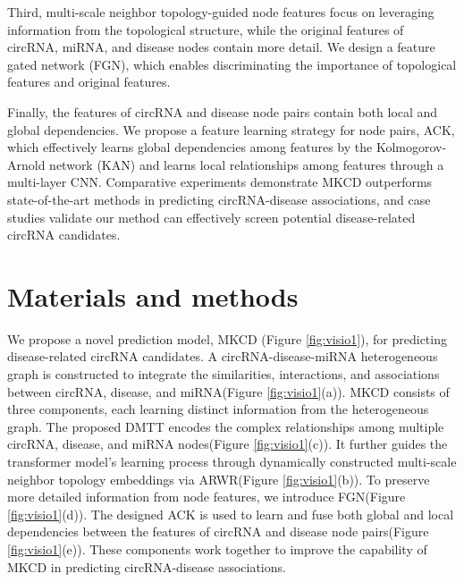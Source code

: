 \documentclass[journal=jcisd8,manuscript=article]{achemso}
\begin{document}
Third, multi-scale neighbor topology-guided node features focus on leveraging information from the topological structure, while the original features of circRNA, miRNA, and disease nodes contain more detail. We design a feature gated network (FGN), which enables discriminating the importance of topological features and original features.

Finally, the features of circRNA and disease node pairs contain both local and global dependencies. We propose a feature learning strategy for node pairs, ACK, which effectively learns global dependencies among features by the Kolmogorov-Arnold network (KAN)\cite{liu2024kan} and learns local relationships among features through a multi-layer CNN. Comparative experiments demonstrate MKCD outperforms state-of-the-art methods in predicting circRNA-disease associations, and case studies validate our method can effectively screen potential disease-related circRNA candidates.

\vspace{-0.5cm}

\section{Materials and methods}
\vspace{-0.3cm}
We propose a novel prediction model, MKCD (Figure \ref{fig:visio1}), for predicting disease-related circRNA candidates. A circRNA-disease-miRNA heterogeneous graph is constructed to integrate the similarities, interactions, and associations between circRNA, disease, and miRNA(Figure \ref{fig:visio1}(a)). MKCD consists of three components, each learning distinct information from the heterogeneous graph. The proposed DMTT encodes the complex relationships among multiple circRNA, disease, and miRNA nodes(Figure \ref{fig:visio1}(c)). It further guides the transformer model's learning process through dynamically constructed multi-scale neighbor topology embeddings via ARWR(Figure \ref{fig:visio1}(b)). To preserve more detailed information from node features, we introduce FGN(Figure \ref{fig:visio1}(d)). The designed ACK is used to learn and fuse both global and local dependencies between the features of circRNA and disease node pairs(Figure \ref{fig:visio1}(e)). These components work together to improve the capability of MKCD in predicting circRNA-disease associations.
\end{document}
